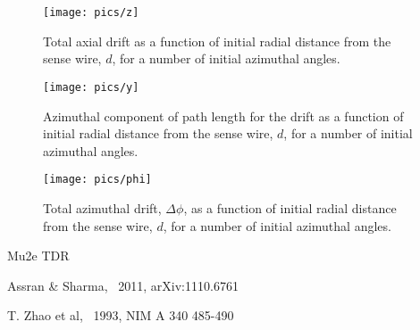 \documentclass[twoside]{article}
\begin{document}
\begin{multicols}{2}
\begin{figure}[H]
\label{fig:z}
    \texttt{[image: pics/z]}
    \caption{Total axial drift as a function of initial radial distance from the sense wire, $d$, for a number of initial azimuthal angles.}
\end{figure}
\begin{figure}[H]
\label{fig:y}
    \texttt{[image: pics/y]}
    \caption{Azimuthal component of path length for the drift as a function of initial radial distance from the sense wire, $d$, for a number of initial azimuthal angles.}
\end{figure}
\begin{figure}[H]
\label{fig:phi}
    \texttt{[image: pics/phi]}
    \caption{Total azimuthal drift, $\Delta \phi$, as a function of initial radial distance from the sense wire, $d$, for a number of initial azimuthal angles.}
\end{figure}








































\begin{thebibliography}{99} %

Mu2e TDR 

Assran \& Sharma, \ 2011, arXiv:1110.6761 

T. Zhao et al, \ 1993, NIM A 340 485-490

\end{thebibliography}


\end{multicols}
\end{document}
